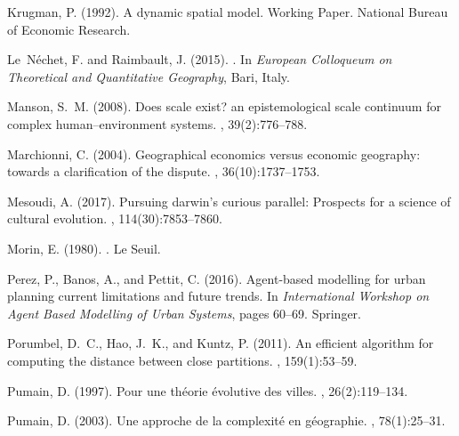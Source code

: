 \documentclass[11pt]{article}
\begin{document}
\begin{thebibliography}{}
Krugman, P. (1992).
\newblock A dynamic spatial model.
\newblock Working Paper. National Bureau of Economic Research.

Le~N{\'e}chet, F. and Raimbault, J. (2015).
.
\newblock In {\em {European Colloqueum on Theoretical and Quantitative
  Geography}}, Bari, Italy.

Manson, S.~M. (2008).
\newblock Does scale exist? an epistemological scale continuum for complex
  human--environment systems.
, 39(2):776--788.

Marchionni, C. (2004).
\newblock Geographical economics versus economic geography: towards a
  clarification of the dispute.
, 36(10):1737--1753.

Mesoudi, A. (2017).
\newblock Pursuing darwin's curious parallel: Prospects for a science of
  cultural evolution.
,
  114(30):7853--7860.

Morin, E. (1980).
.
\newblock Le Seuil.

Perez, P., Banos, A., and Pettit, C. (2016).
\newblock Agent-based modelling for urban planning current limitations and
  future trends.
\newblock In {\em International Workshop on Agent Based Modelling of Urban
  Systems}, pages 60--69. Springer.

Porumbel, D.~C., Hao, J.~K., and Kuntz, P. (2011).
\newblock An efficient algorithm for computing the distance between close
  partitions.
, 159(1):53--59.

Pumain, D. (1997).
\newblock Pour une th{\'e}orie {\'e}volutive des villes.
, 26(2):119--134.

Pumain, D. (2003).
\newblock Une approche de la complexit{\'e} en g{\'e}ographie.
, 78(1):25--31.


\end{thebibliography}
\end{document}
